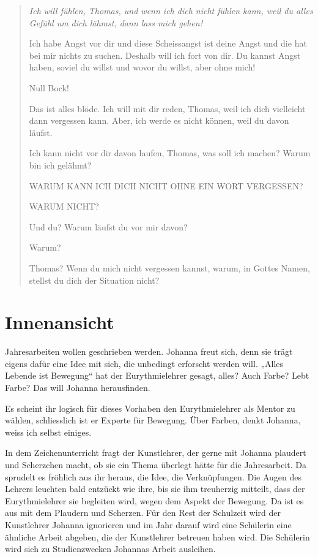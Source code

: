 \documentclass[10pt,a5paper]{book}
\newenvironment{tg}{\begin{quote}\em}{\end{quote}}
\begin{document}
\begin{tg}
Ich will fühlen, Thomas, und wenn ich dich nicht fühlen kann, weil du alles Gefühl um dich lähmst, dann lass mich gehen!

Ich habe Angst vor dir und diese Scheissangst ist deine Angst und die hat bei mir nichts zu suchen. Deshalb will ich fort von dir. Du kannst Angst haben, soviel du willst und wovor du willst, aber ohne mich!

Null Bock!

Das ist alles blöde. Ich will mit dir reden, Thomas, weil ich dich vielleicht dann vergessen kann. Aber, ich werde es nicht können, weil du davon läufst.

Ich kann nicht vor dir davon laufen, Thomas, was soll ich machen?
Warum bin ich gelähmt?

WARUM KANN ICH DICH NICHT OHNE EIN WORT VERGESSEN? 

WARUM NICHT?

Und du? Warum läufst du vor mir davon?

 Warum?
 
Thomas? Wenn du mich nicht vergessen kannst, warum, in Gottes Namen, stellst  du dich der Situation nicht?
\end{tg}


\section*{Innenansicht }


Jahresarbeiten wollen geschrieben werden. Johanna freut sich, denn sie trägt eigens dafür eine Idee mit sich, die unbedingt erforscht werden will. „Alles Lebende ist Bewegung“ hat der Eurythmielehrer gesagt, alles? Auch Farbe? Lebt Farbe? Das will Johanna herausfinden.

Es scheint ihr logisch für dieses Vorhaben den Eurythmielehrer als Mentor zu wählen, schliesslich ist er Experte für Bewegung. Über Farben, denkt Johanna, weiss ich selbst einiges.  

In dem Zeichenunterricht fragt der Kunstlehrer, der gerne mit Johanna plaudert und Scherzchen macht, ob sie ein Thema überlegt hätte für die Jahresarbeit. Da sprudelt es fröhlich aus ihr heraus, die Idee, die Verknüpfungen. Die Augen des Lehrers leuchten bald entzückt wie ihre, bis sie ihm treuherzig mitteilt, dass der Eurythmielehrer sie begleiten wird, wegen dem Aspekt der Bewegung. Da ist es aus mit dem Plaudern und Scherzen. Für den Rest der Schulzeit wird der Kunstlehrer Johanna ignorieren und im Jahr darauf wird eine Schülerin eine ähnliche Arbeit abgeben, die der Kunstlehrer betreuen haben wird. Die Schülerin wird sich zu Studienzwecken Johannas Arbeit ausleihen.
\end{document}
